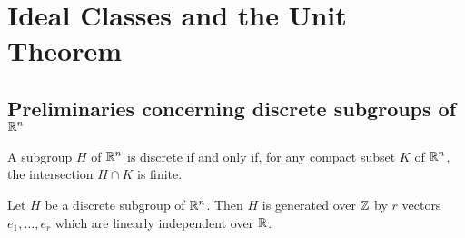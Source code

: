 \chapter{Ideal Classes and the Unit Theorem}

\section{Preliminaries concerning discrete subgroups of $\mathbb{R}^n$}

\begin{definition}
A subgroup $H$ of $\mathbb{R}^n$ is discrete if and only if, for any compact subset $K$ of $\mathbb{R}^n$, the intersection $H\cap K$ is finite.
\end{definition}

\begin{theorem}
  Let $H$ be a discrete subgroup of $\mathbb{R}^n$. Then $H$ is generated over $\mathbb{Z}$ by $r$ vectors $e_1,\ldots, e_r$ which are linearly independent over $\mathbb{R}$.
\end{theorem}

